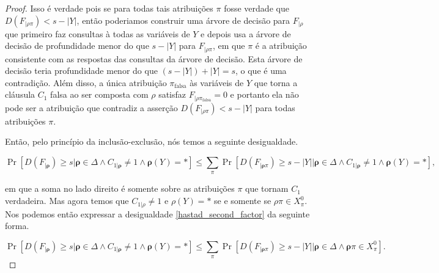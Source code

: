\begin{proof}
Isso é verdade pois se para todas tais atribuições $\pi$ fosse verdade que $D(F_{\lvert \rho \pi}) < s - \lvert Y \rvert$, então poderiamos construir uma árvore de decisão para $F_{\lvert \rho}$ que primeiro faz consultas à todas as variáveis de $Y$ e depois usa a árvore de decisão de profundidade menor do que $s - \lvert Y \rvert$ para $F_{\lvert \rho \pi}$, em que $\pi$ é a atribuição consistente com as respostas das consultas da árvore de decisão. Esta árvore de decisão teria profundidade menor do que $(s - \lvert Y \rvert) + \lvert Y \rvert = s$, o que é uma contradição. Além disso, a única atribuição $\pi_{\text{falsa}}$ às variáveis de $Y$ que torna a cláusula $C_{1}$ falsa ao ser composta com $\rho$ satisfaz $F_{\lvert \rho\pi_{\text{falsa}}} = 0$ e portanto ela não pode ser a atribuição que contradiz a asserção $D(F_{\lvert \rho\pi}) < s - \lvert Y \rvert$ para todas atribuições $\pi$. 

Então, pelo princípio da inclusão-exclusão, nós temos a seguinte desigualdade.

\begin{equation} \label{hastad_second_factor}
    \Pr[D(F_{\lvert \boldsymbol{\rho}}) \geq s \lvert \boldsymbol{\rho} \in \Delta \land C_{1 \lvert \boldsymbol{\rho}} \neq 1 \land \boldsymbol{\rho}(Y) = *] \leq \sum_{\pi} \Pr[D(F_{\lvert \boldsymbol{\rho}\pi}) \geq s - \lvert Y \rvert \lvert \boldsymbol{\rho} \in \Delta \land C_{1 \lvert \boldsymbol{\rho}} \neq 1 \land \boldsymbol{\rho}(Y) = *],
\end{equation}

em que a soma no lado direito é somente sobre as atribuições $\pi$ que tornam $C_{1}$ verdadeira. Mas agora temos que $C_{1 \lvert \rho} \neq 1$ e $\rho(Y) = *$ se e somente se $\rho\pi \in X_{\pi}^{0}$. Nos podemos então expressar a desigualdade \ref{hastad_second_factor} da seguinte forma.

\begin{equation} \label{hastad_second_factor_2}
     \Pr[D(F_{\lvert \boldsymbol{\rho}}) \geq s \lvert \boldsymbol{\rho} \in \Delta \land C_{1 \lvert \boldsymbol{\rho}} \neq 1 \land \boldsymbol{\rho}(Y) = *] \leq \sum_{\pi} \Pr[D(F_{\lvert \boldsymbol{\rho}\pi}) \geq s - \lvert Y \rvert \lvert \boldsymbol{\rho} \in \Delta \land \boldsymbol{\rho}\pi \in X_{\pi}^{0}].
\end{equation}



\end{proof}
